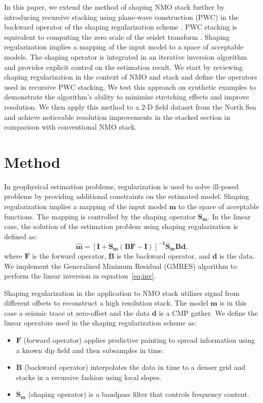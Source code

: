In this paper, we extend the method of shaping NMO stack \cite[]{regimbal} further by introducing recursive stacking
using plane-wave construction (PWC) \cite[]{fomel7} in the backward operator of the shaping regularization scheme \cite[]{fomel}.
PWC stacking is equivalent to computing the zero scale of the seislet transform \cite[]{fomel3}.
Shaping regularization implies a mapping of the input 
model to a space of acceptable models. The shaping operator is integrated in an iterative inversion 
algorithm and provides explicit control on the estimation result. We start by reviewing shaping regularization 
in the context of NMO and stack and define the operators used in recursive PWC stacking. 
We test this approach on synthetic examples to demonstrate the algorithm's ability to minimize 
stretching effects and improve resolution. We then apply this method to a 2-D field dataset from 
the North Sea and achieve noticeable resolution improvements in the stacked section in comparison 
with conventional NMO stack.

\section{Method}

In geophysical estimation problems, regularization is 
used to solve ill-posed problems by providing additional constraints on the estimated model.
Shaping regularization \cite[]{fomel,fomel2} implies a mapping of the input model $\mathbf{m}$ to the space of acceptable functions. The mapping is controlled by the shaping operator $\mathbf{S_m}$. In the linear case, the solution of the estimation problem using shaping regularization is defined as:
\begin{equation}
\label{eq:inv}
\mathbf{\hat{m}=[I+S_m(BF-I)]^{-1}S_mBd},
\end{equation}
where $\mathbf{F}$ is the forward operator, $\mathbf{B}$ is the backward operator, and $\mathbf{d}$
is the data. We implement the Generalized Minimum Residual (GMRES) algorithm \cite[]{saad} to perform the linear inversion 
in equation~\ref{eq:inv}.

Shaping regularization in the application to NMO stack utilizes signal from different offsets
to reconstruct a high resolution stack. The model $\mathbf{m}$ is in this case a seismic trace at zero-offset and the 
data $\mathbf{d}$ is a CMP gather. We define the linear operators used in the shaping regularization 
scheme as:
\begin{itemize}
\item{$\mathbf{F}$ (forward operator) applies predictive painting \cite[]{fomel6} to spread information using a known dip field 
	and then subsamples in time.}
\item{$\mathbf{B}$ (backward operator) interpolates the data in time to a denser grid and stacks in a recursive fashion using local slopes.}
\item{$\mathbf{S_m}$ (shaping operator) is a bandpass filter that controls frequency content.}
\end{itemize}


